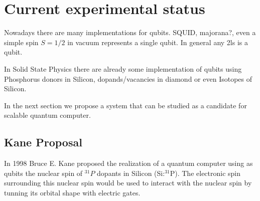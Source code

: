 \chapter{Current experimental status}

Nowadays there are many implementations for qubits. SQUID, majorana?, even a simple spin $S=1/2$ in vacuum represents a single qubit. In general any \ac{2ls} is a qubit.

In Solid State Physics there are already some implementation of qubits using Phosphorus donors in Silicon, dopands/vacancies in diamond or even Isotopes of Silicon.

In the next section we propose a system that can be studied as a candidate for scalable quantum computer.

\section{Kane Proposal}
In 1998 Bruce E. Kane proposed the realization of a quantum computer\cite{Kane1988} using as qubits the nuclear spin of $^{31}P$ dopants in Silicon (Si:$^{31}$P).
The electronic spin surrounding this nuclear spin would be used to interact with the nuclear spin by tunning its orbital shape with electric gates.

